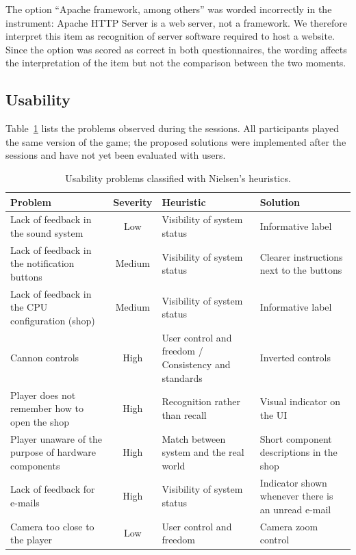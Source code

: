 \documentclass[runningheads]{llncs}
\begin{document}
The option ``Apache framework, among others'' was worded incorrectly in the instrument: Apache HTTP Server is a web server, not a framework. We therefore interpret this item as recognition of server software required to host a website. Since the option was scored as correct in both questionnaires, the wording affects the interpretation of the item but not the comparison between the two moments.

\subsection{Usability}

Table~\ref{tab:DadosNielsen} lists the problems observed during the sessions. All participants played the same version of the game; the proposed solutions were implemented after the sessions and have not yet been evaluated with users.

\begin{table}[htbp]
    \centering
    \caption{Usability problems classified with Nielsen's heuristics.}
    \label{tab:DadosNielsen}
    \scriptsize
    \begin{tabular}{@{}>{\raggedright\arraybackslash}p{3.1cm}c>{\raggedright\arraybackslash}p{3.0cm}>{\raggedright\arraybackslash}p{3.4cm}@{}}
        \toprule
        \textbf{Problem} & \textbf{Severity} & \textbf{Heuristic} & \textbf{Solution} \\ \midrule
        Lack of feedback in the sound system & Low & Visibility of system status & Informative label \\
        Lack of feedback in the notification buttons & Medium & Visibility of system status & Clearer instructions next to the buttons \\
        Lack of feedback in the CPU configuration (shop) & Medium & Visibility of system status & Informative label \\
        Cannon controls & High & User control and freedom / Consistency and standards & Inverted controls \\
        Player does not remember how to open the shop & High & Recognition rather than recall & Visual indicator on the UI \\
        Player unaware of the purpose of hardware components & High & Match between system and the real world & Short component descriptions in the shop \\
        Lack of feedback for e-mails & High & Visibility of system status & Indicator shown whenever there is an unread e-mail \\
        Camera too close to the player & Low & User control and freedom & Camera zoom control \\
        \bottomrule
    \end{tabular}
\end{table}
\end{document}
